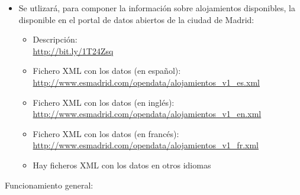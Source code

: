 \begin{itemize}
\item Se utlizará, para componer la información sobre alojamientos disponibles, la disponible en el portal de datos abiertos de la ciudad de Madrid:

  \begin{itemize}
  \item Descripción: \\
    \url{http://bit.ly/1T24Zsq}
  \item Fichero XML con los datos (en español): \\
    \url{http://www.esmadrid.com/opendata/alojamientos_v1_es.xml}
  \item Fichero XML con los datos (en inglés): \\
    \url{http://www.esmadrid.com/opendata/alojamientos_v1_en.xml}
  \item Fichero XML con los datos (en francés): \\
    \url{http://www.esmadrid.com/opendata/alojamientos_v1_fr.xml}
  \item Hay ficheros XML con los datos en otros idiomas
  \end{itemize}
\end{itemize}

Funcionamiento general:

